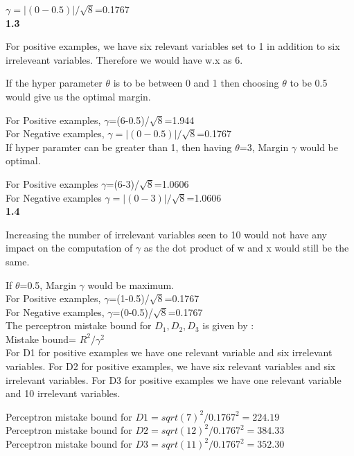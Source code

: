\documentclass[11pt]{article}
\begin{document}
\begin{itemize}
 $\gamma=|(0-0.5)|/\sqrt{8}$=0.1767\\

\textbf{1.3}

For positive examples, we have six relevant variables set to 1 in addition to six irreleveant variables. Therefore we would have w.x as 6.

If the hyper parameter $\theta$ is to be between 0 and 1 then choosing $\theta$ to be 0.5 would give us the optimal margin.

For Positive examples, $\gamma$=(6-0.5)/$\sqrt{8}$=1.944\\
For Negative examples, $\gamma=|(0-0.5)|/\sqrt{8}$=0.1767\\

If hyper paramter can be greater than 1, then having $\theta$=3, Margin $\gamma$ would be optimal. 

For Positive examples $\gamma$=(6-3)/$\sqrt{8}$=1.0606\\
For Negative examples $\gamma=|(0-3)|/\sqrt{8}$=1.0606\\


\textbf{1.4}

Increasing the number of irrelevant variables seen to 10 would not have any impact on the computation of $\gamma$ as the dot product of w and x would still be the same.

If $\theta$=0.5, Margin $\gamma$ would be maximum. \\

For Positive examples, $\gamma$=(1-0.5)/$\sqrt{8}$=0.1767\\
For Negative examples, $\gamma$=(0-0.5)/$\sqrt{8}$=0.1767\\

The perceptron mistake bound for $D_1 , D_2, D_3$ is given by : \\

Mistake bound= $R^2/\gamma^2$\\

For D1 for positive examples we have one relevant variable and six irrelevant variables. For D2 for positive examples, we have six relevant variables and six irrelevant variables. For D3 for positive examples we have one relevant variable and 10 irrelevant variables.

Perceptron mistake bound for $D1=sqrt(7)^2/0.1767^2=224.19$\\
Perceptron mistake bound for $D2=sqrt(12)^2/0.1767^2=384.33$\\
Perceptron mistake bound for $D3=sqrt(11)^2/0.1767^2=352.30$\\


\end{itemize}
\end{document}
